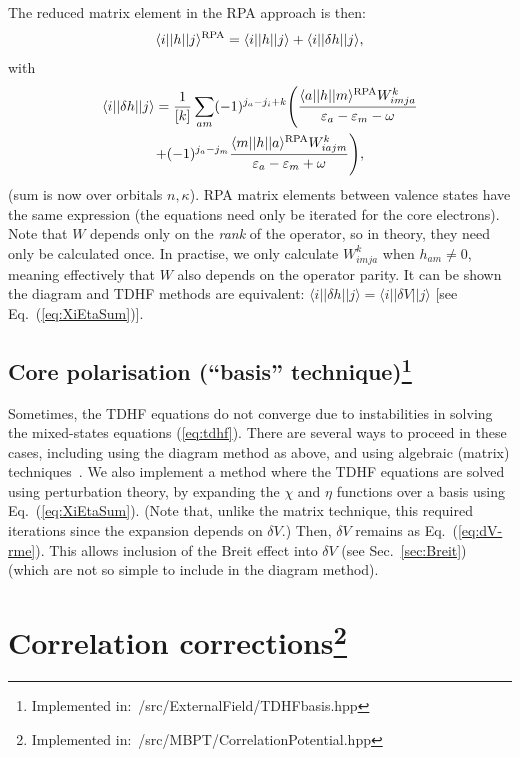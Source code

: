 \documentclass[10pt,twocolumn,a4paper]{article}%
\newcommand{\bra}[1]{\ensuremath{\langle #1|}}	%
\newcommand{\ket}[1]{\ensuremath{|#1\rangle}}	%
\newcommand{\be}{\begin{equation}}
\newcommand{\ee}{\end{equation}}
\def\en{\ensuremath{\varepsilon}}
\renewcommand{\k}{\ensuremath{\kappa}}
\begin{document}
The reduced matrix element in the RPA approach is then:
\be
\bra{i}|h|\ket{j}^{\rm RPA} = \bra{i}|h|\ket{j} + \bra{i}|\delta h|\ket{j},
\ee
with
\begin{multline}
\bra{i}|\delta h|\ket{j} = 
\frac{1}{[k]}\sum_{am}(-1)^{j_a-j_i+k}\Bigg(
 \frac{\bra{a}|h|\ket{m}^{\rm RPA}W^k_{imja}}{\en_a-\en_m-\omega}\\
+ (-1)^{j_a-j_m}\frac{\bra{m}|h|\ket{a}^{\rm RPA}W^k_{iajm}}{\en_a-\en_m+\omega}
\Bigg),
\end{multline}
(sum is now over {\rm orbitals $n,\k$}).
RPA matrix elements between valence states have the same expression (the equations need only be iterated for the core electrons).
Note that $W$ depends only on the {\em rank} of the operator, so in theory, they need only be calculated once.
In practise, we only calculate $W^k_{imja}$ when $h_{am}\neq0$, meaning effectively that $W$ also depends on the operator parity.
It can be shown the diagram and TDHF methods are equivalent:
 $\bra{i}|\delta h|\ket{j}=\bra{i}|\delta V|\ket{j}$ [see Eq.~(\ref{eq:XiEtaSum})].




\subsection[Core polarisation (``basis'' technique)]{Core polarisation (``basis'' technique)\footnote{Implemented in:~/src/ExternalField/TDHFbasis.hpp}\label{sec:RPA-basis}}
%

Sometimes, the TDHF equations do not converge due to instabilities in solving the mixed-states equations (\ref{eq:tdhf}).
There are several ways to proceed in these cases, including using the diagram method as above, and using algebraic (matrix) techniques~\cite{Johnson1989}.
We also implement a method where the TDHF equations are solved using perturbation theory, by expanding the $\chi$ and $\eta$ functions over a basis using Eq.~(\ref{eq:XiEtaSum}). (Note that, unlike the matrix technique, this required iterations since the expansion depends on $\delta V$.)
Then, $\delta V$ remains as Eq.~(\ref{eq:dV-rme}).
This allows inclusion of the Breit effect into $\delta V$ (see Sec.~\ref{sec:Breit}) (which are not so simple to include in the diagram method).





\section[Correlation corrections]{Correlation corrections\footnote{Implemented in:~/src/MBPT/CorrelationPotential.hpp}}
\end{document}
